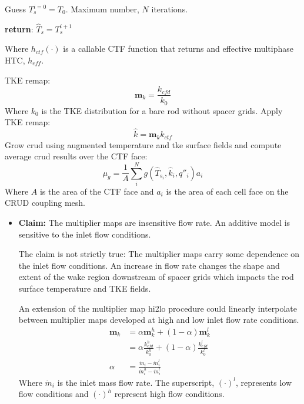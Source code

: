 \begin{itemize}
    \begin{algorithm}[H]
    Guess $T^{i=0}_s=T_0$.  Maximum number, $N$ iterations.

        \textbf{return}: $\hat T_s = T^{i+1}_s$
        \end{algorithm}
    Where $h_{ctf}(\cdot)$ is a callable CTF function that returns and effective multiphase HTC, $h_{eff}$.

    TKE remap:
    \begin{equation}
       \mathbf m_{k} = \frac{k_{cfd}}{k_{0}}
    \end{equation}
    Where $k_0$ is the TKE distribution for a bare rod without spacer grids.
    Apply TKE remap:
       \begin{equation}
       \hat k = \mathbf m_k k_{ctf}
       \end{equation}
     Grow crud using augmented temperature and tke surface fields and compute average crud results over the CTF face:
     \begin{equation}
     \mu_g = \frac{1}{A} \sum_i^N g(\hat T_{s_i}, \hat k_i, q''_i) a_i
     \end{equation}
    Where $A$ is the area of the CTF face and $a_i$ is the area of each cell face on the CRUD coupling mesh.

    \begin{itemize}
    \item \textbf{Claim:} The multiplier maps are insensitive flow rate.  An additive model is sensitive to the inlet flow conditions.

     The claim is not strictly true: The multiplier maps carry some dependence on the inlet flow conditions.  An increase in flow rate changes the shape and extent of the wake region downstream of spacer grids which impacts the rod surface temperature and TKE fields.

    An extension of the multiplier map hi2lo procedure could linearly interpolate between multiplier maps developed at high and low inlet flow rate conditions.
    \begin{align*}
        \mathbf m_k &= \alpha \mathbf m_k^h + (1 - \alpha) \mathbf m_k^l \\
                    &= \alpha \frac{k^h_{cfd}}{k^h_0} + (1 - \alpha) \frac{k^l_{cfd}}{k^l_0} \\
        \alpha & = \frac{\dot m_i - \dot m_i^l }{\dot m_i^h - \dot m_i^l}
    \end{align*}
    Where $\dot m_i$ is the inlet mass flow rate.  The superscript, $(\cdot)^l$, represents low flow conditions and $(\cdot)^h$ represent high flow conditions.


\end{itemize}
\end{itemize}
